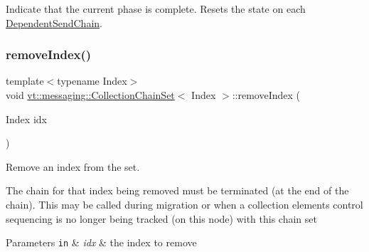 Indicate that the current phase is complete. Resets the state on each {\ttfamily \hyperlink{classvt_1_1messaging_1_1_dependent_send_chain}{Dependent\+Send\+Chain}}. 

\mbox{\label{classvt_1_1messaging_1_1_collection_chain_set_a299e52c482aba47bcdabe796d236c043}} 
\subsubsection{\texorpdfstring{remove\+Index()}{removeIndex()}}
{\footnotesize\ttfamily template$<$typename Index$>$ \\
void \hyperlink{classvt_1_1messaging_1_1_collection_chain_set}{vt\+::messaging\+::\+Collection\+Chain\+Set}$<$ Index $>$\+::remove\+Index (\begin{DoxyParamCaption}\item[{Index}]{idx }\end{DoxyParamCaption})\hspace{0.3cm}{\ttfamily [inline]}}



Remove an index from the set. 

The chain for that index being removed must be terminated (at the end of the chain). This may be called during migration or when a collection element\textquotesingle{}s control sequencing is no longer being tracked (on this node) with this chain set


\begin{DoxyParams}[1]{Parameters}
\mbox{\tt in}  & {\em idx} & the index to remove \\
\hline
\end{DoxyParams}
\mbox{\label{classvt_1_1messaging_1_1_collection_chain_set_abbc0c0995c4961fcd07f46303b06d58e}} 
